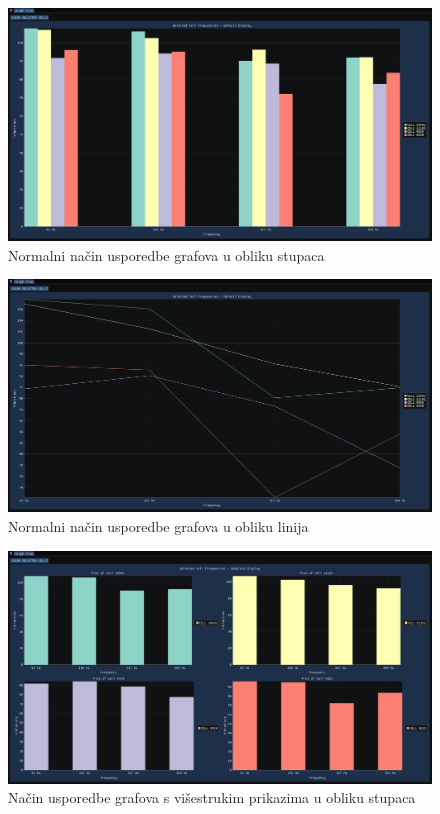 \documentclass[times, utf8, diplomski]{fer}
\begin{document}
\begin{figure}[H]
	\centering
	\includegraphics[width=\textwidth]{default_graph_display_bars.png}
	\caption{Normalni način usporedbe grafova u obliku stupaca}
    \label{appendix:default_graph_display_bars}
\end{figure}

\begin{figure}[H]
	\centering
	\includegraphics[width=\textwidth]{default_graph_display_lines.png}
	\caption{Normalni način usporedbe grafova u obliku linija}
    \label{appendix:default_graph_display_lines}
\end{figure}

\begin{figure}[H]
	\centering
	\includegraphics[width=\textwidth]{subplots_graph_display_bars.png}
	\caption{Način usporedbe grafova s višestrukim prikazima u obliku stupaca}
    \label{appendix:subplots_graph_display_bars}
\end{figure}
\end{document}
